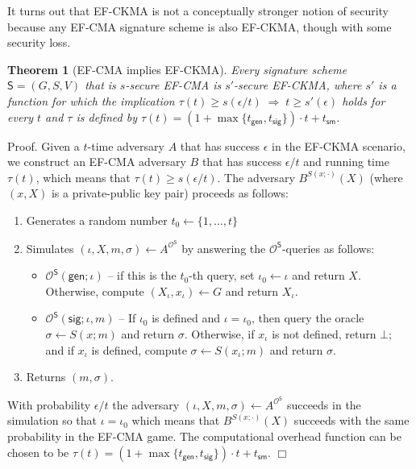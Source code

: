 \documentclass{article}
\newtheorem{theorem}{Theorem}[section]
\newenvironment{proof}{\textsf{Proof}.}{\hfill$\Box$}
\begin{document}
It turns out that EF-CKMA is not a conceptually stronger notion of security because any EF-CMA signature scheme is also EF-CKMA, though with some security loss.

\begin{theorem}[EF-CMA implies EF-CKMA]
Every signature scheme $\mathsf{S}=(G,S,V)$ that is $s$-secure EF-CMA is $s'$-secure EF-CKMA, where $s'$ is a function for which the implication $\tau(t)\ge s(\epsilon/t) \; \Rightarrow \; t\ge s'(\epsilon)$ holds for every $t$ and $\tau$ is defined by $\tau(t)=(1+\max\{t_\mathsf{gen},t_\mathsf{sig}\})\cdot t + t_\mathsf{sm}$.
\end{theorem}
\begin{proof}
Given a $t$-time adversary $A$ that has success $\epsilon$ in the EF-CKMA scenario, we construct an EF-CMA adversary $B$ that has success $\epsilon/t$ and running time $\tau(t)$, which means that $\tau(t)\ge s(\epsilon/t)$. The adversary $B^{S(x;\cdot)}(X)$ (where $(x,X)$ is a private-public key pair) proceeds as follows:
\begin{enumerate}
\item Generates a random number $t_0\gets \{1,\ldots,t\}$
\item Simulates $(\iota,X,m,\sigma)\gets A^{\mathcal{O}^\mathsf{S}}$ by answering the $\mathcal{O}^\mathsf{S}$-queries as follows:
\begin{itemize}
\item $\mathcal{O}^\mathsf{S}(\mathsf{gen};\iota)$ -- if this is the $t_0$-th query, set $\iota_0\gets \iota$ and return $X$. Otherwise, compute $(X_\iota,x_\iota)\gets G$ and return $X_\iota$.
\item $\mathcal{O}^\mathsf{S}(\mathsf{sig};\iota,m)$ -- If $\iota_0$ is defined and $\iota=\iota_0$, then query the oracle $\sigma\gets S(x;m)$ and return $\sigma$. Otherwise, if $x_\iota$ is not defined, return $\bot$; and if $x_\iota$ is defined, compute $\sigma \gets S(x_\iota;m)$ and return $\sigma$.
\end{itemize}
\item Returns $(m,\sigma)$.
\end{enumerate}
With probability $\epsilon/t$ the adversary $(\iota,X,m,\sigma)\gets A^{\mathcal{O}^\mathsf{S}}$ succeeds in the simulation so that $\iota=\iota_0$ which means that $B^{S(x;\cdot)}(X)$ succeeds with the same probability in the EF-CMA game. The computational overhead function can be chosen to be $\tau(t)=(1+\max\{t_\mathsf{gen},t_\mathsf{sig}\})\cdot t + t_\mathsf{sm}$.
\end{proof}
\end{document}
